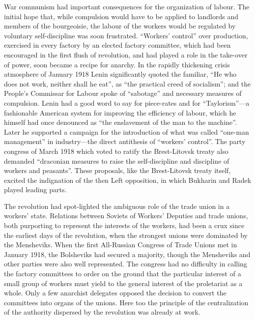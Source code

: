War communism had important consequences for the organization of labour. The initial hope that, while compulsion would have to be applied to landlords and members of the bourgeoisie, the labour of the workers would be regulated by voluntary self-discipline was soon frustrated. ``Workers' control'' over production, exercised in every factory by an elected factory committee, which had been encouraged in the first flush of revolution, and had played a role in the take-over of power, soon became a recipe for anarchy. In the rapidly thickening crisis atmosphere of January 1918 Lenin significantly quoted the familiar, ``He who does not work, neither shall he eat'', as ``the practical creed of socialism''; and the People's Commissar for Labour spoke of ``sabotage'' and necessary measures of compulsion. Lenin had a good word to say for piece-rates and for ``Taylorism''---a fashionable American system for improving the efficiency of labour, which he himself had once denounced as ``the enslavement of the man to the machine''. Later he supported a campaign for the introduction of what was called ``one-man management'' in industry---the direct antithesis of ``workers' control''. The party congress of March 1918 which voted to ratify the Brest-Litovsk treaty also demanded ``draconian measures to raise the self-discipline and discipline of workers and peasants''. These proposals, like the Brest-Litovsk treaty itself, excited the indignation of the then Left opposition, in which Bukharin and Radek played leading parts. 

The revolution had spot-lighted the ambiguous role of the trade union in a workers' state. Relations between Soviets of Workers' Deputies and trade unions, both purporting to represent the interests of the workers, had been a crux since the earliest days of the revolution, when the strongest unions were dominated by the Mensheviks. When the first All-Russian Congress of Trade Unions met in January 1918, the Bolsheviks had secured a majority, though the Mensheviks and other parties were also well represented. The congress had no difficulty in calling the factory committees to order on the ground that the particular interest of a small group of workers must yield to the general interest of the proletariat as a whole. Only a few anarchist delegates opposed the decision to convert the committees into organs of the unions. Here too the principle of the centralization of the authority dispersed by the revolution was already at work. 

